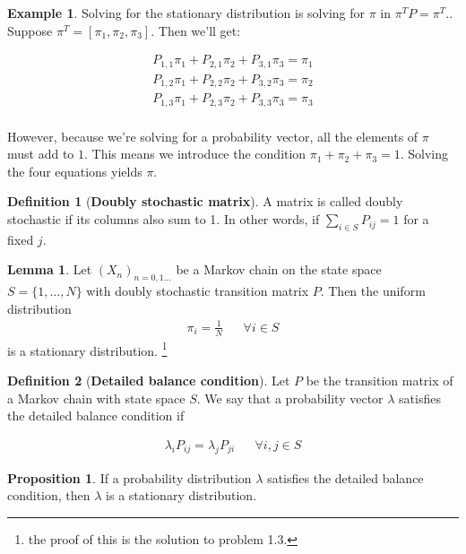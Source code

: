 \documentclass[12pt]{article}
\theoremstyle{definition}
\newtheorem{definition}{Definition}[section]
\newtheorem{lemma}[theorem]{Lemma}
\newtheorem{proposition}{Proposition}[section]
\newtheorem{example}{Example}[section]
\begin{document}
\begin{example}
Solving for the stationary distribution is solving for $\pi$ in $\pi^T P = \pi^T.$. Suppose $\pi^T = [\pi_1, \pi_2, \pi_3]$. Then we'll get:

\begin{align*}
  P_{1,1}\pi_1 + P_{2,1} \pi_2 + P_{3,1} \pi_3 = \pi_1 \\
  P_{1,2}\pi_1 + P_{2,2} \pi_2 + P_{3,2} \pi_3 = \pi_2 \\
  P_{1,3}\pi_1 + P_{2,3} \pi_2 + P_{3,3} \pi_3 = \pi_3 \\
\end{align*}

However, because we're solving for a probability vector, all the elements of $\pi$ must add to $1$. This means we introduce the condition $\pi_1 + \pi_2 + \pi_3 = 1$. Solving the four equations yields $\pi$.

\end{example}

\begin{definition}[\textbf{Doubly stochastic matrix}]
  A matrix is called doubly stochastic if its columns also sum to 1. In other words, if $\sum_{i \in S} P_{ij} = 1$ for a fixed $j$.
\end{definition}

\begin{lemma}
  Let $(X_n)_{n=0,1...}$ be a Markov chain on the state space $S = \{1, \dots, N\}$ with doubly stochastic transition matrix $P$. Then the uniform distribution
  \begin{align*}
    \pi_i = \frac{1}{N} && \forall i \in S
  \end{align*}
  is a stationary distribution. \footnote{the proof of this is the solution to problem 1.3.}
\end{lemma}

\begin{definition}[\textbf{Detailed balance condition}]
  Let $P$ be the transition matrix of a Markov chain with state space $S$. We say that a probability vector $\lambda$ satisfies the detailed balance condition if

  \begin{align*}
    \lambda_i P_{ij} = \lambda_jP_{ji} && \forall i,j \in S
  \end{align*}
\end{definition}

\begin{proposition}
  If a probability distribution $\lambda$ satisfies the detailed balance condition, then $\lambda$ is a stationary distribution.
\end{proposition}
\end{document}
